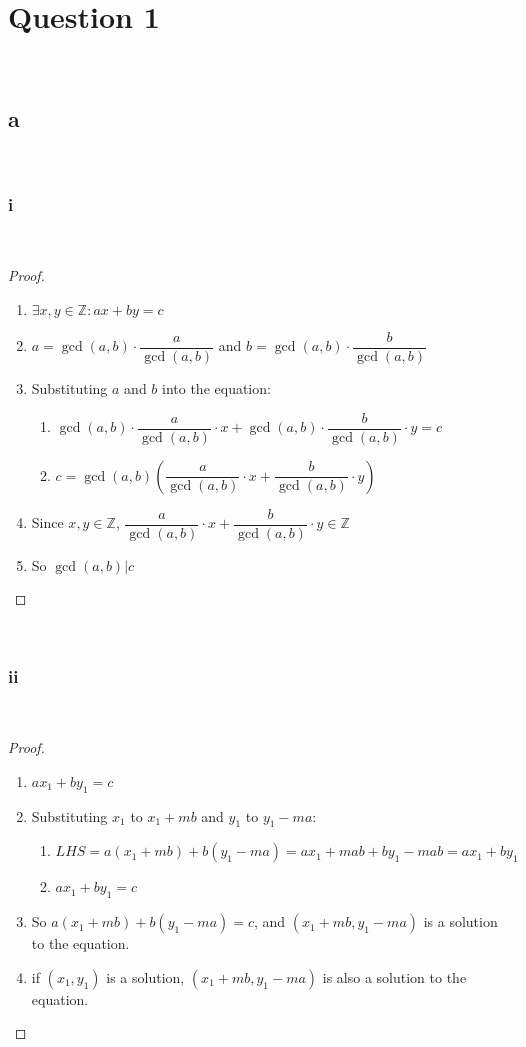 \documentclass{article}
\begin{document}
\section*{Question 1}

~
\subsection*{a}

~

\subsubsection*{i}

~

\begin{proof}
~
    \begin{enumerate}
        \item $\exists x,y\in \mathbb{Z}:ax+by=c$
        \item $a=\gcd(a,b)\cdot \dfrac{a}{\gcd(a,b)}$ and $b=\gcd(a,b)\cdot \dfrac{b}{\gcd(a,b)}$
        \item Substituting $a$ and $b$ into the equation:
        \begin{enumerate}
            \item $\gcd(a,b)\cdot \dfrac{a}{\gcd(a,b)}\cdot x+\gcd(a,b)\cdot \dfrac{b}{\gcd(a,b)}\cdot y=c$
            \item $c=\gcd(a,b)\left(\dfrac{a}{\gcd(a,b)}\cdot x+\dfrac{b}{\gcd(a,b)}\cdot y\right)$
        \end{enumerate}
        \item Since $x,y\in\mathbb{Z}$, $\dfrac{a}{\gcd(a,b)}\cdot x+\dfrac{b}{\gcd(a,b)}\cdot y\in\mathbb{Z}$
        \item So $\gcd(a,b)|c$
    \end{enumerate}
\end{proof}

~

\subsubsection*{ii}

~

\begin{proof}
    ~

    \begin{enumerate}
        \item $ax_1+by_1=c$
        \item Substituting $x_1$ to $x_1+mb$ and $y_1$ to $y_1-ma$:
        \begin{enumerate}
            \item $LHS=a(x_1+mb)+b(y_1-ma)=ax_1+mab+by_1-mab=ax_1+by_1$
            \item $ax_1+by_1=c$
        \end{enumerate}
        \item So $a(x_1+mb)+b(y_1-ma)=c$, and $(x_1+mb,y_1-ma)$ is a solution to the equation.
        \item if $(x_1,y_1)$ is a solution, $(x_1+mb,y_1-ma)$ is also a solution to the equation.
    \end{enumerate}
\end{proof}
\end{document}
